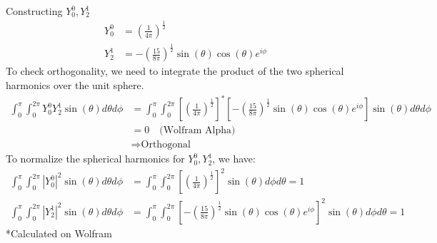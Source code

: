 \documentclass{article}
\begin{document}
\noindent Constructing \(Y_0^0, Y_2^1\)
\begin{align*}
	Y_0^0 & = \left(\frac{1}{4 \pi}\right)^{\frac{1}{2}}                                        \\
	Y_2^1 & = - \left(\frac{15}{8 \pi}\right)^{\frac{1}{2}} \sin(\theta)\cos(\theta) e^{i \phi}
\end{align*}
To check orthogonality, we need to integrate the product of the two spherical harmonics over the unit sphere.
\begin{align*}
	\int_{0}^{\pi} \int_{0}^{2\pi} Y_0^0 Y_2^1 \sin(\theta) d\theta d\phi & =  \int_{0}^{\pi} \int_{0}^{2\pi}  \left[\left(\frac{1}{4 \pi}\right)^{\frac{1}{2}}\right]^* \left[- \left(\frac{15}{8 \pi}\right)^{\frac{1}{2}} \sin(\theta)\cos(\theta) e^{i \phi}\right] \sin(\theta) d\theta d\phi \\
	                                                                      & = 0 \quad \text{(Wolfram Alpha)}                                                                                                                                                                                       \\
	                                                                      & \Rightarrow \text{Orthogonal}
\end{align*}
To normalize the spherical harmonics for \(Y_0^0, Y_2^1\), we have:
\begin{align*}
	\int_{0}^{\pi} \int_{0}^{2 \pi} |Y_0^0|^2 \sin(\theta) d\theta d\phi & = \int_{0}^{\pi} \int_{0}^{2 \pi} \left[\left(\frac{1}{4 \pi}\right)^{\frac{1}{2}} \right]^2 \sin(\theta) d\phi  d\theta = 1                                       \\
	\int_{0}^{\pi} \int_{0}^{2 \pi} |Y_2^1|^2 \sin(\theta) d\theta d\phi & = \int_{0}^{\pi} \int_{0}^{2 \pi} \left[- \left(\frac{15}{8 \pi}\right)^{\frac{1}{2}} \sin(\theta)\cos(\theta) e^{i \phi}\right]^2 \sin(\theta) d\phi  d\theta = 1
\end{align*}
*Calculated on Wolfram
\end{document}
